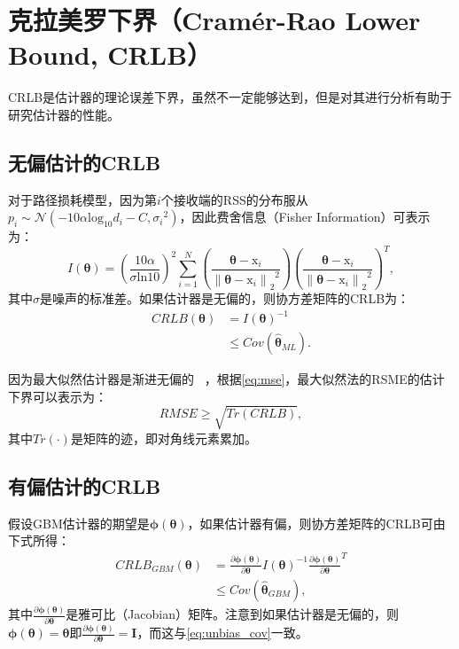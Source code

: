 \section{克拉美罗下界（Cram\'{e}r-Rao Lower Bound, CRLB）}

CRLB是估计器的理论误差下界，虽然不一定能够达到，但是对其进行分析有助于研究估计器的性能。

\subsection{无偏估计的CRLB}

对于路径损耗模型，因为第$i$个接收端的RSS的分布服从$p_i \sim \mathcal{N}(-10\alpha\mathrm{log}_{10}{d_i} -C, {\sigma_i}^2)$，因此费舍信息（Fisher Information）可表示为：
\begin{equation}
I(\bm{\theta}) = (\frac{10\alpha}{\sigma\mathrm{ln}10})^2\sum\limits_{i = 1}^N(\frac{{\bm\theta} - \bm{\mathrm{x}}_i}{{\left\|{\bm\theta} - \bm{\mathrm{x}}_i\right\|_2}^2})(\frac{{\bm\theta} - \bm{\mathrm{x}}_i}{{\left\|{\bm\theta} - \bm{\mathrm{x}}_i\right\|_2}^2})^T, \label{eq:fisher}
\end{equation}
其中$\sigma$是噪声的标准差。如果估计器是无偏的，则协方差矩阵的CRLB为：
\begin{equation}
\begin{split}
CRLB(\bm{\theta}) &= I(\bm{\theta})^{-1} \label{eq:unbias_cov}\\
&\le Cov(\widehat{\bm{\theta}}_{ML}).
\end{split}
\end{equation}

因为最大似然估计器是渐进无偏的~ \cite{kay1993fundamentals}，根据\eqref{eq:mse}，最大似然法的RSME的估计下界可以表示为：
\begin{equation}
RMSE \ge \sqrt{Tr(CRLB)},\label{eq:rmse_ml}
\end{equation}
其中$Tr(\cdot)$是矩阵的迹，即对角线元素累加。

\subsection{有偏估计的CRLB}

假设GBM估计器的期望是$\bm\phi(\bm{\theta})$，如果估计器有偏，则协方差矩阵的CRLB可由下式所得：
\begin{equation}
\begin{split}
CRLB_{GBM}(\bm{\theta}) &= {\frac{\partial\bm\phi(\bm{\theta})}{\partial \bm\theta}}I(\bm{\theta})^{-1}{\frac{\partial\bm\phi(\bm{\theta})}{\partial \bm\theta}}^T\\
& \le Cov(\widehat{\bm{\theta}}_{GBM}),
\end{split}
\end{equation}
其中$\frac{\partial\bm\phi(\bm{\theta})}{\partial \bm\theta}$是雅可比（Jacobian）矩阵。注意到如果估计器是无偏的，则$\bm\phi(\bm{\theta}) = \bm{\theta}$即$\frac{\partial\bm\phi(\bm{\theta})}{\partial \bm\theta} = \bm{I}$，而这与\eqref{eq:unbias_cov}一致。

